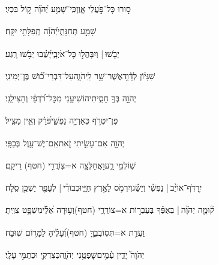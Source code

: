 \documentclass[12pt]{article}
\newcommand{\loc}[1]{\textsuperscript{\locf{#1}}}
\begin{document}
{\loc{ ט}~}‏ס֣וּרוּ  כׇּל־פֹּ֣עֲלֵי אָ֑וֶן{\hfill}כִּֽי־שָׁמַ֥ע יְ֝הֹוָ֗ה ק֣וֹל בִּכְיִֽי׃\par

{\loc{ י}~}‏שָׁמַ֣ע  תְּחִנָּתִ֑י{\hfill}יְ֝הֹוָ֗ה תְּֽפִלָּתִ֥י יִקָּֽח׃\par

{\loc{ יא}~}‏יֵבֹ֤שׁוּ |  וְיִבָּהֲל֣וּ  כׇּל־אֹיְבָ֑י{\hfill}יָ֝שֻׁ֗בוּ יֵבֹ֥שׁוּ רָֽגַע׃\par\pend
\ledpb
\pstart[\subsection*{\textcolor{red}{פרק ז}}]\label{פרק ז}
{\loc{ א}~}‏שִׁגָּי֗וֹן לְדָ֫וִ֥ד\newline\hspace*{.5em}אֲשֶׁר־שָׁ֥ר לַֽיהֹוָ֑ה{\hfill}עַל־דִּבְרֵי־כ֝֗וּשׁ בֶּן־יְמִינִֽי׃\par

{\loc{ ב}~}‏יְהֹוָ֣ה  בְּךָ֣ חָסִ֑יתִי{\hfill}הוֹשִׁיעֵ֥נִי מִכׇּל־רֹ֝דְפַ֗י וְהַצִּילֵֽנִי׃\par

{\loc{ ג}~}‏פֶּן־יִטְרֹ֣ף כְּאַרְיֵ֣ה נַפְשִׁ֑י{\hfill}פֹּ֝רֵ֗ק וְאֵ֣ין מַצִּֽיל׃\par

{\loc{ ד}~}‏יְהֹוָ֣ה  אִם־עָשִׂ֣יתִי זֹ֑את{\hfill}אִֽם־יֶשׁ־עָ֥וֶל בְּכַפָּֽי׃\par

{\loc{ ה}~}‏ שֽׁוֹלְמִ֥י רָ֑ע{\hfill}וָאֲחַלְּצָ֖ה א=צֽוֹרֲרִ֣י (חטף) רֵיקָֽם׃\par

{\loc{ ו}~}‏יִ֥רַדֹּֽף־אוֹיֵ֨ב |  נַפְשִׁ֡י וְיַשֵּׂ֗ג{\hfill}וְיִרְמֹ֣ס לָאָ֣רֶץ חַיָּ֑י\newline\hspace*{.5em}וּכְבוֹדִ֓י | {\hfill}לֶעָפָ֖ר יַשְׁכֵּ֣ן סֶֽלָה׃\par

{\loc{ ז}~}‏ק֘וּמָ֤ה יְהֹוָ֨ה |  בְּאַפֶּ֗ךָ{\hfill} בְּעַבְר֣וֹת א=צוֹרֲרָ֑י (חטף)\newline\hspace*{.5em}וְע֥וּרָה אֵ֝לַ֗י{\hfill}מִשְׁפָּ֥ט צִוִּֽיתָ׃\par

{\loc{ ח}~}‏וַעֲדַ֣ת  א=תְּסֽוֹבֲבֶ֑ךָּ (חטף){\hfill}וְ֝עָלֶ֗יהָ לַמָּר֥וֹם שֽׁוּבָה׃\par

{\loc{ ט}~}‏יְהֹוָה֮ יָדִ֢ין עַ֫מִּ֥ים{\hfill}שׇׁפְטֵ֥נִי יְהֹוָ֑ה{\hfill}כְּצִדְקִ֖י וּכְתֻמִּ֣י עָלָֽי׃\par
\end{document}
